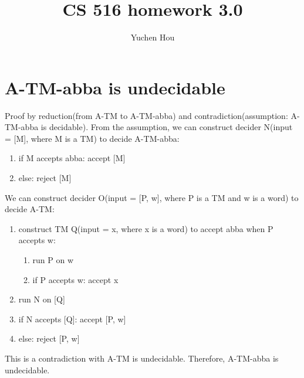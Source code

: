 \documentclass{article}
\begin{document}
\lstset{language=python, tabsize=4}
\title{CS 516 homework 3.0}
\author{Yuchen Hou}
\maketitle

\section{A-TM-abba is undecidable}
Proof by reduction(from A-TM to A-TM-abba) and contradiction(assumption: A-TM-abba is decidable). From the assumption, we can construct decider N(input = [M], where M is a TM) to decide A-TM-abba:
\begin{enumerate}
	\item if M accepts abba: accept [M]
	\item else: reject [M]
\end{enumerate}
We can construct decider O(input = [P, w], where P is a TM and w is a word) to decide A-TM:
\begin{enumerate}
	\item construct TM Q(input = x, where x is a word) to accept abba when P 
	accepts w:
	\begin{enumerate}
		\item run P on w
		\item if P accepts w: accept x
	\end{enumerate}
	\item run N on [Q]
	\item if N accepts [Q]: accept [P, w]
	\item else: reject [P, w]
\end{enumerate}
This is a contradiction with A-TM is undecidable. Therefore, A-TM-abba is undecidable.
\end{document}
